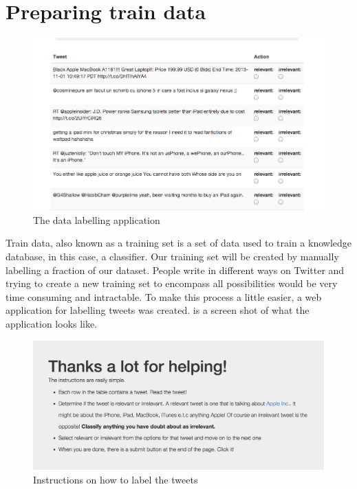 \section{Preparing train data}
\begin{figure}
  \begin{center}
    \includegraphics[scale=0.6]{figures/datalabeller}
  \end{center}
  \caption{The data labelling application}
\label{fig:labeller}
\end{figure}

Train data, also known as a training set is a set of data used to train a knowledge database, in
this case, a classifier. Our training set will be created by manually labelling a fraction of our
dataset. People write in different ways on Twitter and trying to create a new training set to
encompass all possibilities would be very time consuming and intractable. To make this process a
little easier, a web application for labelling tweets was created.  is a
screen shot of what the application looks like.

\begin{figure}
  \begin{center}
    \includegraphics[scale=0.4]{figures/labeller_instructions}
  \end{center}
  \caption{Instructions on how to label the tweets}
\label{fig:labeller_instructions}
\end{figure}

